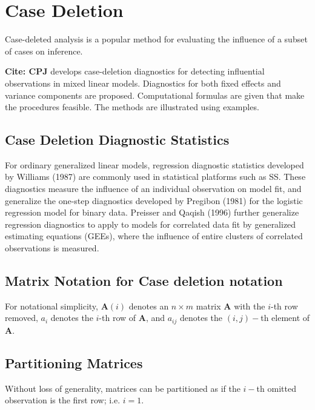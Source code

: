 \documentclass[12pt, a4paper]{article}
\theoremstyle{plain}
\theoremstyle{definition}
\theoremstyle{remark}
\begin{document}
\section{Case Deletion} %
Case-deleted analysis is a popular method for evaluating the inﬂuence of a subset of cases on inference.

\textbf{Cite: CPJ} develops case-deletion diagnostics for detecting influential observations in mixed linear models. Diagnostics for both fixed effects and variance components are proposed. Computational formulas are given that make the procedures feasible. The methods are illustrated using examples. 

\subsection{Case Deletion Diagnostic Statistics}

For ordinary generalized linear models, regression diagnostic statistics developed by Williams (1987) are commonly used in statistical platforms such as SS. These diagnostics measure the influence of an individual observation on model fit, and generalize the one-step diagnostics developed by Pregibon (1981) for the logistic regression model for binary data.
Preisser and Qaqish (1996) further generalize regression diagnostics to apply to models for correlated data fit by generalized estimating equations (GEEs), where the influence of entire clusters of correlated observations is measured.


\subsection{Matrix Notation for  Case deletion notation} %

For notational simplicity, $\boldsymbol{A}(i)$ denotes an $n \times m$ matrix $\boldsymbol{A}$ with the $i$-th row
removed, $a_i$ denotes the $i$-th row of $\boldsymbol{A}$, and $a_{ij}$ denotes the $(i, j)-$th element of $\boldsymbol{A}$.

\subsection{Partitioning Matrices} %
Without loss of generality, matrices can be partitioned as if the $i-$th omitted observation is the first row; i.e. $i=1$.

\newpage
\end{document}
